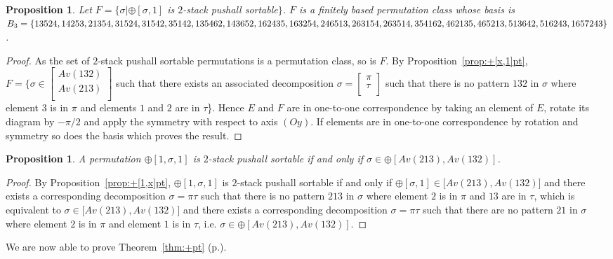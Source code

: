 \documentclass[11pt]{article}
\newtheorem{prop}[thm]{Proposition}
\newcommand{\pushall}{$2$-stack pushall sortable\xspace}
\begin{document}
\begin{prop}
\label{prop:B3}
Let $F = \{ \sigma | \oplus[\sigma,1]$ is \pushall $\}$. 
$F$ is a finitely based permutation class whose basis is $B_3 = \{13524, 14253, 21354, 31524, 31542, 35142, 135462, 143652, \\162435, 163254, 246513, 263154, 263514, 354162, 462135, 465213, 513642, 516243, 1657243 \}$.
\end{prop}
\begin{proof}
As the set of \pushall permutations is a permutation class, so is $F$. 
By Proposition~\ref{prop:+[x,1]pt}, $F = \{ \sigma \in \left[
\begin{array}{l}
Av(132) \\
Av(213) \\
\end{array}
\right]$ such that there exists an associated decomposition $\sigma = \left[
\begin{array}{l}
\pi \\
\tau \\
\end{array}
\right] $ such that there is no pattern $132$ in $\sigma$ where element $3$ is in $\pi$ and elements $1$ and $2$ are in $\tau$\}.
Hence $E$ and $F$ are in one-to-one correspondence by taking an element of $E$, rotate its diagram by $-\pi/2$ and apply the symmetry with respect to axis $(Oy)$. 
If elements are in one-to-one correspondence by rotation and symmetry so does the basis which proves the result.
\end{proof}


\begin{prop}
\label{prop:+[1,x,1]pt}
A permutation $\oplus[1,\sigma,1]$ is \pushall if and only if $\sigma \in \oplus[Av(213), Av(132)]$.
\end{prop}
\begin{proof}
By Proposition~\ref{prop:+[1,x]pt}, $\oplus[1,\sigma,1]$ is \pushall if and only if $\oplus[\sigma,1] \in \big[Av(213), Av(132)\big]$ and there exists a corresponding decomposition $\sigma = \pi \tau$ such that there is no pattern $213$ in $\sigma$ where element $2$ is in $\pi$ and $13$ are in $\tau$, which is equivalent to $\sigma \in \big[Av(213), Av(132)\big]$ and there exists a corresponding decomposition $\sigma = \pi \tau$ such that there are no pattern $21$ in $\sigma$ where element $2$ is in $\pi$ and element $1$ is in $\tau$, i.e. $\sigma \in \oplus[Av(213), Av(132)]$.
\end{proof}

We are now able to prove Theorem~\ref{thm:+pt} (p.\pageref{thm:+pt}).
\end{document}
